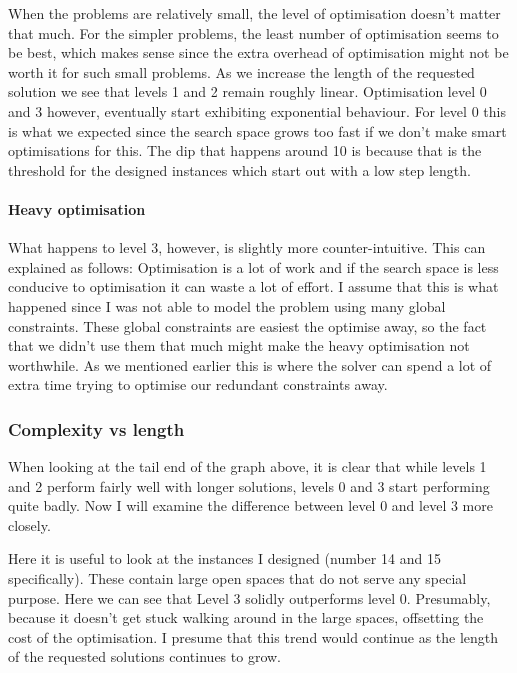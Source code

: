 \documentclass[british]{article}
\begin{document}
	When the problems are relatively small, the level of optimisation doesn't matter that much. For the simpler problems, the least number of optimisation seems to be best, which makes sense since the extra overhead of optimisation might not be worth it for such small problems. As we increase the length of the requested solution we see that levels 1 and 2 remain roughly linear. Optimisation level 0 and 3 however, eventually start exhibiting exponential behaviour. For level 0 this is what we expected since the search space grows too fast if we don't make smart optimisations for this. The dip that happens around 10 is because that is the threshold for the designed instances which start out with a low step length.
	
	\paragraph{Heavy optimisation} What happens to level 3, however, is slightly more counter-intuitive. This can explained as follows: Optimisation is a lot of work and if the search space is less conducive to optimisation it can waste a lot of effort. I assume that this is what happened since I was not able to model the problem using many global constraints. These global constraints are easiest the optimise away, so the fact that we didn't use them that much might make the heavy optimisation not worthwhile. As we mentioned earlier this is where the solver can spend a lot of extra time trying to optimise our redundant constraints away. 
	
	\subsubsection{Complexity vs length} 
	
	When looking at the tail end of the graph above, it is clear that while levels 1 and 2 perform fairly well with longer solutions, levels 0 and 3 start performing quite badly. Now I will examine the difference between level 0 and level 3 more closely. 
	
	Here it is useful to look at the instances I designed (number 14 and 15 specifically). These contain large open spaces that do not serve any special purpose. Here we can see that Level 3 solidly outperforms level 0. Presumably, because it doesn't get stuck walking around in the large spaces, offsetting the cost of the optimisation. I presume that this trend would continue as the length of the requested solutions continues to grow. 
	
\end{document}
